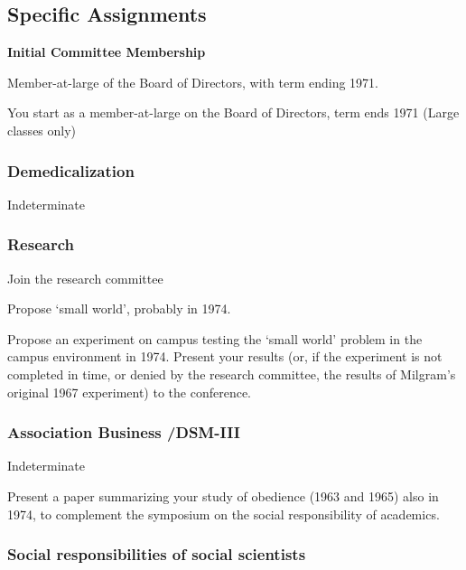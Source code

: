 \begin{refsection}
\subsection{Specific Assignments}
\label{specificassignments}

\textbf{Initial Committee Membership}

\begin{service}[Milgram]\label{service:milgram}
Member-at-large of the Board of Directors, with term ending 1971.
\end{service}

You start as a member-at-large on the Board of Directors, term ends 1971 (Large classes only)

\subsubsection{Demedicalization}
\label{demedicalization}

Indeterminate

\subsubsection{Research}
\label{research}

Join the research committee

\begin{researchtask}[Milgram]\label{researchtask:milgram}Propose ‘small world’, probably in 1974.
\end{researchtask}Propose an experiment on campus testing the `small world' problem in the campus environment in 1974. Present your results (or, if the experiment is not completed in time, or denied by the research committee, the results of Milgram's original 1967 experiment) to the conference.

\subsubsection{Association Business \slash  DSM-III}
\label{associationbusinessdsm-iii}

Indeterminate\begin{writingtask}[Milgram]\label{writingtask:milgram}
Present a paper summarizing your study of obedience (1963 and 1965) also in 1974, to complement the symposium on the social responsibility of academics.
\end{writingtask}

\subsubsection{Social responsibilities of social scientists}
\label{socialresponsibilitiesofsocialscientists}


\end{refsection}
